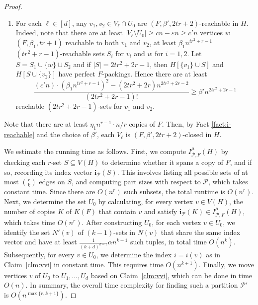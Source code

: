 \documentclass[11pt, letterpaper]{amsart}
\theoremstyle{plain}
\numberwithin{equation}{section}
\theoremstyle{definition}
\newcommand\card[1]{\left| #1 \right|}
\renewcommand{\vec}[1]{{\mathbf #1}}
\begin{document}
\begin{proof}
\begin{enumerate}
\item For each \(\ell\in [d]\), any $ v_1,v_2\in V_\ell\cap U_0 $ are $ (F,\beta',2tr+2) $-reachable in \(H\). 
Indeed, note that there are at least $\card{V_{\ell}\setminus U_0}\ge cn-\varepsilon n\ge c'n $ vertices $w$ \((F,\beta_1,tr+1)\) reachable to both \(v_1\) and \(v_2\), at least $\beta_1n^{tr^2+r-1}$ $ (tr^2+r-1) $-reachable sets $S_i$ for $v_i$ and $w$ for $ i=1,2 $. Let \(S=S_1\cup \{w\}\cup S_2\) and if \(\card{S}=2tr^2+2r-1\), then \(H[\{v_1\}\cup S]\) and \(H[S\cup \{v_2\}]\) have perfect \(F\)-packings. 
Hence there are at least
\[
\dfrac{ (c'n)\cdot(\beta_1n^{tr^2+r-1})^2-(2tr^2+2r)n^{2tr^2+2r-2}}{(2tr^2+2r-1)!} \ge \beta' n^{2tr^2+2r-1} 
\]
reachable $ (2tr^2+2r-1) $-sets for $ v_1 $ and $ v_2 $. 
\end{enumerate} 
Note that there are at least \(\eta_1 n^{r-1}\cdot n/r\) copies of \(F\). Then, by Fact \ref{fact:i-reachable} and the choice of \(\beta'\), each $ V_{\ell} $ is $ (F,\beta',2tr+2) $-closed in $H$.


We estimate the running time as follows. 
First, we compute $ I_{\mathcal{P},F}^{\mu}(H)$ by checking each $r$-set $S\subseteq V(H)$ to determine whether it spans a copy of \(F\), and if so, recording its index vector \(\vec{i}_{\mathcal{P}}(S)\). 
This involves listing all possible sets of at most $\binom{r}{k}$ edges on \(S\), and computing part sizes with respect to $\mathcal{P}$, which takes constant time. 
Since there are $O(n^r)$ such subsets, the total runtime is $O(n^r)$. 
Next, we determine the set $U_0$ by calculating, for every vertex $v\in V(H)$, the number of copies $K$ of $K(F)$ that contain $v$ and satisfy $\vec{i}_{\mathcal{P}}(K)\in I_{\mathcal{P},F}^{\mu}(H)$, which takes time $O(n^r)$. 
After constructing $U_0$, for each vertex $v\in U_0$, we identify the set $N'(v)$ of $ (k-1) $-sets in $ N(v) $ that share the same index vector and have at least $ \frac{1}{(k+d)^{k-1}}\alpha n^{k-1} $ such tuples, in total time $ O(n^k) $. 
Subsequently, for every $ v \in U_0 $, we determine the index $i=i(v)$ as in Claim~\ref{clm:vvi} in constant time. 
This requires time $O(n^{k+1})$.
Finally, we move vertices \(v\) of $U_0$ to $U_1,\dots,U_d$ based on Claim~\ref{clm:vvi}, which can be done in time $O(n)$.
In summary, the overall time complexity for finding such a partition $\mathcal{P}'$ is $O(n^{\max\{r,k+1\}})$.
\end{proof}
\end{document}
